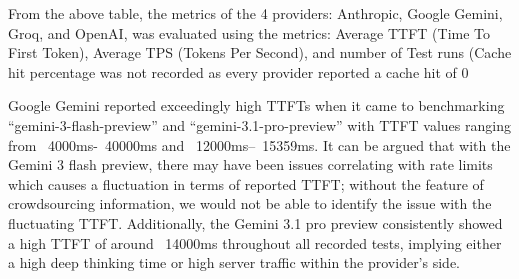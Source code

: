 \documentclass[11pt, a4paper]{article}
\begin{document}
\begin{table}[h]
\centering
{}
\caption{Per-provider performance in terms of TTFT (ms), TPS and number of test runs.}
\label{tab:granular_results}
\end{table}

From the above table, the metrics of the 4 providers: Anthropic, Google Gemini, Groq, and OpenAI, was evaluated using the metrics: Average TTFT (Time To First Token), Average TPS (Tokens Per Second), and number of Test runs (Cache hit percentage was not recorded as every provider reported a cache hit of 0%

Google Gemini reported exceedingly high TTFTs when it came to benchmarking “gemini-3-flash-preview” and “gemini-3.1-pro-preview” with TTFT values ranging from ~4000ms-~40000ms and ~12000ms–~15359ms. It can be argued that with the Gemini 3 flash preview, there may have been issues correlating with rate limits which causes a fluctuation in terms of reported TTFT; without the feature of crowdsourcing information, we would not be able to identify the issue with the fluctuating TTFT. Additionally, the Gemini 3.1 pro preview consistently showed a high TTFT of around ~14000ms throughout all recorded tests, implying either a high deep thinking time or high server traffic within the provider’s side.
\end{document}
